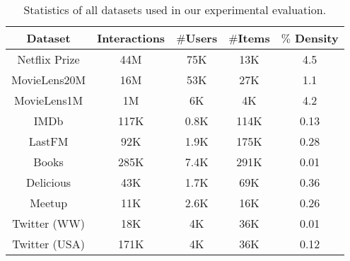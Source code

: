 \documentclass[sigconf]{acmart}
\begin{document}
\begin{table}[htbp]
  \centering
    \begin{tabular}{c|cccc}
    \hline
    \textbf{Dataset} & \textbf{Interactions} & \textbf{$\#$Users} & \textbf{$\#$Items} & \textbf{$\%$ Density} \\
    \hline
    Netflix Prize & 44M   & 75K   & 13K   & 4.5 \\
    MovieLens20M & 16M   & 53K   & 27K   & 1.1 \\
    MovieLens1M & 1M    & 6K    & 4K    & 4.2 \\
IMDb  & 117K  & 0.8K  & 114K  & 0.13 \\
    LastFM & 92K   & 1.9K  & 175K  & 0.28 \\
    Books & 285K  & 7.4K  & 291K  & 0.01 \\
    Delicious & 43K   & 1.7K  & 69K   & 0.36 \\
    Meetup & 11K   & 2.6K  & 16K   & 0.26 \\
Twitter (WW) & 18K   & 4K    & 36K   & 0.01 \\
    Twitter (USA) & 171K  & 4K    & 36K   & 0.12 \\
    \hline
    \end{tabular}\caption{Statistics of all datasets used in our experimental evaluation. }
  \label{tab:dataset}\end{table}
\end{document}
